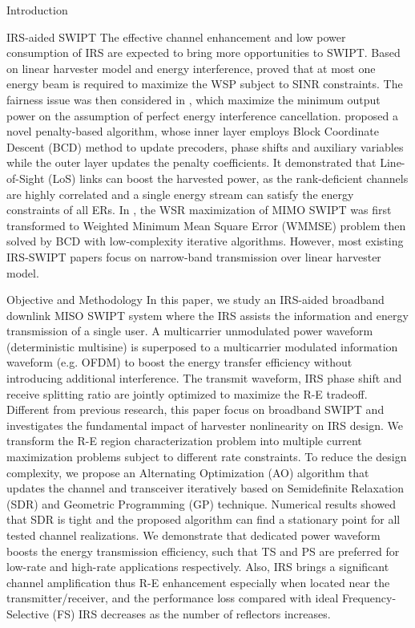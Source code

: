 \documentclass[journal]{IEEEtran}
\begin{document}
\begin{section}{Introduction}
	\begin{subsection}{IRS-aided SWIPT}
		The effective channel enhancement and low power consumption of IRS are expected to bring more opportunities to SWIPT. Based on linear harvester model and energy interference, \cite{Wu2019b} proved that at most one energy beam is required to maximize the WSP subject to SINR constraints. The fairness issue was then considered in \cite{Tang2019}, which maximize the minimum output power on the assumption of perfect energy interference cancellation. \cite{Wu2019c} proposed a novel penalty-based algorithm, whose inner layer employs Block Coordinate Descent (BCD) method to update precoders, phase shifts and auxiliary variables while the outer layer updates the penalty coefficients. It demonstrated that Line-of-Sight (LoS) links can boost the harvested power, as the rank-deficient channels are highly correlated and a single energy stream can satisfy the energy constraints of all ERs. In \cite{Pan2019a}, the WSR maximization of MIMO SWIPT was first transformed to Weighted Minimum Mean Square Error (WMMSE) problem then solved by BCD with low-complexity iterative algorithms. However, most existing IRS-SWIPT papers focus on narrow-band transmission over linear harvester model.
	\end{subsection}

	\begin{subsection}{Objective and Methodology}
		In this paper, we study an IRS-aided broadband downlink MISO SWIPT system where the IRS assists the information and energy transmission of a single user. A multicarrier unmodulated power waveform (deterministic multisine) is superposed to a multicarrier modulated information waveform (e.g. OFDM) to boost the energy transfer efficiency without introducing additional interference. The transmit waveform, IRS phase shift and receive splitting ratio are jointly optimized to maximize the R-E tradeoff. Different from previous research, this paper focus on broadband SWIPT and investigates the fundamental impact of harvester nonlinearity on IRS design. We transform the R-E region characterization problem into multiple current maximization problems subject to different rate constraints. To reduce the design complexity, we propose an Alternating Optimization (AO) algorithm that updates the channel and transceiver iteratively based on Semidefinite Relaxation (SDR) and Geometric Programming (GP) technique. Numerical results showed that SDR is tight and the proposed algorithm can find a stationary point for all tested channel realizations. We demonstrate that dedicated power waveform boosts the energy transmission efficiency, such that TS and PS are preferred for low-rate and high-rate applications respectively. Also, IRS brings a significant channel amplification thus R-E enhancement especially when located near the transmitter/receiver, and the performance loss compared with ideal Frequency-Selective (FS) IRS decreases as the number of reflectors increases.
	\end{subsection}
\end{section}
\end{document}
